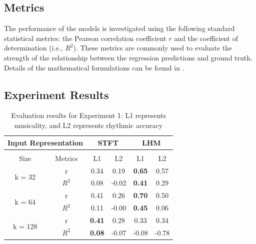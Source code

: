 \documentclass{article}
\begin{document}
\subsection{Metrics}
The performance of the models is investigated using the following standard statistical metrics: the Pearson correlation coefficient $r$ and the coefficient of determination (i.e., $R^{2}$). These metrics are commonly used to evaluate the strength of the relationship between the regression predictions and ground truth. Details of the mathematical formulations can be found in \cite{McClave2003}. 

\subsection{Experiment Results}
\begin{table}
\centering
\begin{tabularx}{0.48 \textwidth}{cccccc}
\hline
\multicolumn{2}{c}{Input Representation}                                             & \multicolumn{2}{c}{STFT} & \multicolumn{2}{c}{LHM}       \\ \hline
\begin{tabular}[c]{@{}c@{}}Dictionary \\ Size\end{tabular} & Metrics                 & L1         & L2          & L1            & L2            \\ \hline
\multirow{2}{*}{k = 32}                                    & r                       & 0.34       & 0.19        & \textbf{0.65}          & 0.57 \\
                                                           & $R^{2}$ & 0.08       & -0.02       & \textbf{0.41}          & 0.29 \\ \hline
\multirow{2}{*}{k = 64}                                    & r                       & 0.41       & 0.26        & \textbf{0.70} & 0.50          \\
                                                           & $R^{2}$ & 0.11       & -0.00       & \textbf{0.45} & 0.06          \\ \hline
\multirow{2}{*}{k = 128}                                   & r                       & \textbf{0.41}       & 0.28        & 0.33          & 0.34          \\
                                                           & $R^{2}$ & \textbf{0.08}       & -0.07       & -0.08         & -0.78         \\ \hline
\end{tabularx}
\caption{Evaluation results for Experiment 1: L1 represents musicality, and L2 represents rhythmic accuracy}
\label{tab:exp1}
\end{table}
\end{document}
